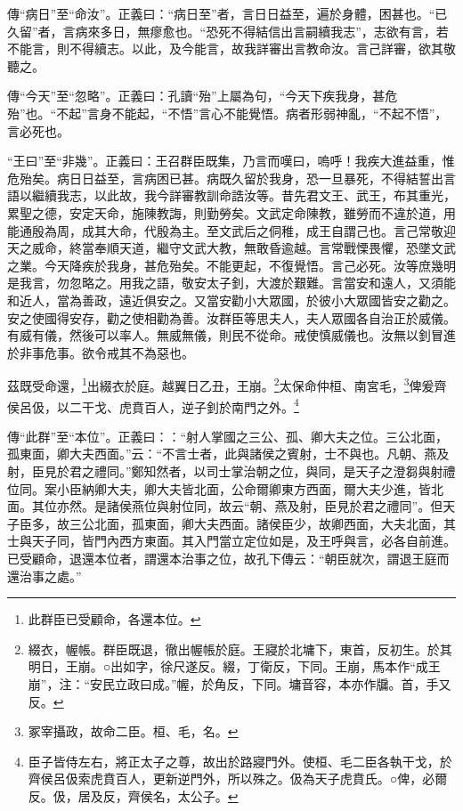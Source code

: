{\noindent\zhuan{}\fzbyks 傳“病日”至“命汝”。正義曰：“病日至”者，言日日益至，遍於身體，困甚也。“已久留”者，言病來多日，無瘳愈也。“恐死不得結信出言嗣續我志”，志欲有言，若不能言，則不得續志。以此，及今能言，故我詳審出言教命汝。言己詳審，欲其敬聽之。 \par}

{\noindent\zhuan{}\fzbyks 傳“今天”至“忽略”。正義曰：孔讀“殆”上屬為句，“今天下疾我身，甚危殆”也。“不起”言身不能起，“不悟”言心不能覺悟。病者形弱神亂，“不起不悟”，言必死也。 \par}

{\noindent\shu{}\fzkt “王曰”至“非幾”。正義曰：王召群臣既集，乃言而嘆曰，嗚呼！我疾大進益重，惟危殆矣。病日日益至，言病困已甚。病既久留於我身，恐一旦暴死，不得結誓出言語以繼續我志，以此故，我今詳審教訓命誥汝等。昔先君文王、武王，布其重光，累聖之德，安定天命，施陳教誨，則勤勞矣。文武定命陳教，雖勞而不違於道，用能通殷為周，成其大命，代殷為主。至文武后之侗稚，成王自謂己也。言己常敬迎天之威命，終當奉順天道，繼守文武大教，無敢昏逾越。言常戰慄畏懼，恐墜文武之業。今天降疾於我身，甚危殆矣。不能更起，不復覺悟。言己必死。汝等庶幾明是我言，勿忽略之。用我之語，敬安太子釗，大渡於艱難。言當安和遠人，又須能和近人，當為善政，遠近俱安之。又當安勸小大眾國，於彼小大眾國皆安之勸之。安之使國得安存，勸之使相勸為善。汝群臣等思夫人，夫人眾國各自治正於威儀。有威有儀，然後可以率人。無威無儀，則民不從命。戒使慎威儀也。汝無以釗冒進於非事危事。欲令戒其不為惡也。 \par}

茲既受命還，\footnote{此群臣已受顧命，各還本位。}出綴衣於庭。越翼日乙丑，王崩。\footnote{綴衣，幄帳。群臣既退，徹出幄帳於庭。王寢於北墉下，東首，反初生。於其明日，王崩。○出如字，徐尺遂反。綴，丁衛反，下同。王崩，馬本作“成王崩”，注：“安民立政曰成。”幄，於角反，下同。墉音容，本亦作牖。首，手又反。}太保命仲桓、南宮毛，\footnote{冢宰攝政，故命二臣。桓、毛，名。}俾爰齊侯呂伋，以二干戈、虎賁百人，逆子釗於南門之外。\footnote{臣子皆侍左右，將正太子之尊，故出於路寢門外。使桓、毛二臣各執干戈，於齊侯呂伋索虎賁百人，更新逆門外，所以殊之。伋為天子虎賁氏。○俾，必爾反。伋，居及反，齊侯名，太公子。}


{\noindent\zhuan{}\fzbyks 傳“此群”至“本位”。正義曰：：“射人掌國之三公、孤、卿大夫之位。三公北面，孤東面，卿大夫西面。”云：“不言士者，此與諸侯之賓射，士不與也。凡朝、燕及射，臣見於君之禮同。”鄭知然者，以司士掌治朝之位，與同，是天子之澄芻與射禮位同。案小臣納卿大夫，卿大夫皆北面，公命爾卿東方西面，爾大夫少進，皆北面。其位亦然。是諸侯燕位與射位同，故云“朝、燕及射，臣見於君之禮同”。但天子臣多，故三公北面，孤東面，卿大夫西面。諸侯臣少，故卿西面，大夫北面，其士與天子同，皆門內西方東面。其入門當立定位如是，及王呼與言，必各自前進。已受顧命，退還本位者，謂還本治事之位，故孔下傳云：“朝臣就次，謂退王庭而還治事之處。” \par}

